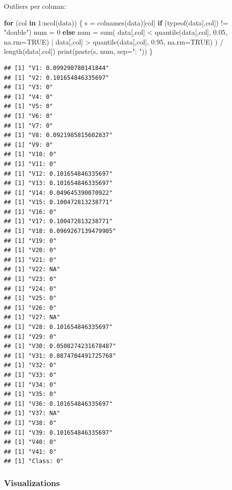 \documentclass[
]{article}
\newenvironment{Shaded}{\begin{snugshade}}{\end{snugshade}}
\newcommand{\AttributeTok}[1]{\textcolor[rgb]{0.77,0.63,0.00}{#1}}
\newcommand{\ConstantTok}[1]{\textcolor[rgb]{0.00,0.00,0.00}{#1}}
\newcommand{\ControlFlowTok}[1]{\textcolor[rgb]{0.13,0.29,0.53}{\textbf{#1}}}
\newcommand{\DecValTok}[1]{\textcolor[rgb]{0.00,0.00,0.81}{#1}}
\newcommand{\FloatTok}[1]{\textcolor[rgb]{0.00,0.00,0.81}{#1}}
\newcommand{\FunctionTok}[1]{\textcolor[rgb]{0.00,0.00,0.00}{#1}}
\newcommand{\NormalTok}[1]{#1}
\newcommand{\OtherTok}[1]{\textcolor[rgb]{0.56,0.35,0.01}{#1}}
\newcommand{\SpecialCharTok}[1]{\textcolor[rgb]{0.00,0.00,0.00}{#1}}
\newcommand{\StringTok}[1]{\textcolor[rgb]{0.31,0.60,0.02}{#1}}
\begin{document}
Outliers per column:

\begin{Shaded}
\begin{Highlighting}[]
\ControlFlowTok{for}\NormalTok{ (col }\ControlFlowTok{in} \DecValTok{1}\SpecialCharTok{:}\FunctionTok{ncol}\NormalTok{(data)) \{}
\NormalTok{    s }\OtherTok{=} \FunctionTok{colnames}\NormalTok{(data)[col]}
    \ControlFlowTok{if}\NormalTok{ (}\FunctionTok{typeof}\NormalTok{(data[,col]) }\SpecialCharTok{!=} \StringTok{"double"}\NormalTok{)}
\NormalTok{        num }\OtherTok{=} \DecValTok{0}
    \ControlFlowTok{else} 
\NormalTok{        num }\OtherTok{=} \FunctionTok{sum}\NormalTok{(}
\NormalTok{            data[,col] }\SpecialCharTok{\textless{}} \FunctionTok{quantile}\NormalTok{(data[,col], }\FloatTok{0.05}\NormalTok{, }\AttributeTok{na.rm=}\ConstantTok{TRUE}\NormalTok{) }\SpecialCharTok{|}
\NormalTok{            data[,col] }\SpecialCharTok{\textgreater{}} \FunctionTok{quantile}\NormalTok{(data[,col], }\FloatTok{0.95}\NormalTok{, }\AttributeTok{na.rm=}\ConstantTok{TRUE}\NormalTok{)}
\NormalTok{        ) }\SpecialCharTok{/} \FunctionTok{length}\NormalTok{(data[,col])}
    \FunctionTok{print}\NormalTok{(}\FunctionTok{paste}\NormalTok{(s, num, }\AttributeTok{sep=}\StringTok{": "}\NormalTok{))}
\NormalTok{\}}
\end{Highlighting}
\end{Shaded}

\begin{verbatim}
## [1] "V1: 0.099290780141844"
## [1] "V2: 0.101654846335697"
## [1] "V3: 0"
## [1] "V4: 0"
## [1] "V5: 0"
## [1] "V6: 0"
## [1] "V7: 0"
## [1] "V8: 0.0921985815602837"
## [1] "V9: 0"
## [1] "V10: 0"
## [1] "V11: 0"
## [1] "V12: 0.101654846335697"
## [1] "V13: 0.101654846335697"
## [1] "V14: 0.049645390070922"
## [1] "V15: 0.100472813238771"
## [1] "V16: 0"
## [1] "V17: 0.100472813238771"
## [1] "V18: 0.0969267139479905"
## [1] "V19: 0"
## [1] "V20: 0"
## [1] "V21: 0"
## [1] "V22: NA"
## [1] "V23: 0"
## [1] "V24: 0"
## [1] "V25: 0"
## [1] "V26: 0"
## [1] "V27: NA"
## [1] "V28: 0.101654846335697"
## [1] "V29: 0"
## [1] "V30: 0.0508274231678487"
## [1] "V31: 0.0874704491725768"
## [1] "V32: 0"
## [1] "V33: 0"
## [1] "V34: 0"
## [1] "V35: 0"
## [1] "V36: 0.101654846335697"
## [1] "V37: NA"
## [1] "V38: 0"
## [1] "V39: 0.101654846335697"
## [1] "V40: 0"
## [1] "V41: 0"
## [1] "Class: 0"
\end{verbatim}

\hypertarget{visualizations}{%
\subsubsection{Visualizations}\label{visualizations}}
\end{document}
